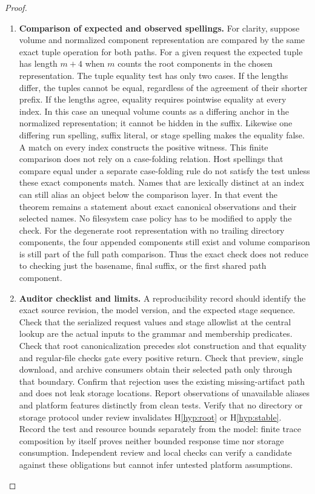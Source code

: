 \documentclass[12pt]{article}
\begin{document}
\begin{proof}
\begin{enumerate}
\item \textbf{Comparison of expected and observed spellings.}
For clarity, suppose volume and normalized component representation
are compared by the same exact tuple operation for both paths.
For a given request the expected tuple has length $m+4$ when
$m$ counts the root components in the chosen representation.
The tuple equality test has only two cases. If the lengths
differ, the tuples cannot be equal, regardless of the agreement
of their shorter prefix. If the lengths agree, equality requires
pointwise equality at every index. In this case an unequal
volume counts as a differing anchor in the normalized
representation; it cannot be hidden in the suffix.
Likewise one differing run spelling, suffix literal, or stage
spelling makes the equality false. A match on every index
constructs the positive witness. This finite comparison does not
rely on a case-folding relation. Host spellings that compare
equal under a separate case-folding rule do not satisfy the test
unless these exact components match. Names that are lexically
distinct at an index can still alias an object below the
comparison layer. In that event the theorem remains a statement
about exact canonical observations and their selected names.
No filesystem case policy has to be modified to apply the check.
For the degenerate root representation with no trailing directory
components, the four appended components still exist and volume
comparison is still part of the full path comparison.
Thus the exact check does not reduce to checking just the
basename, final suffix, or the first shared path component.

\item \textbf{Auditor checklist and limits.}
A reproducibility record should identify the exact source revision,
the model version, and the expected stage sequence. Check that the
serialized request values and stage allowlist at the central lookup
are the actual inputs to the grammar and membership predicates.
Check that root canonicalization precedes slot construction and
that equality and regular-file checks gate every positive return.
Check that preview, single download, and archive consumers obtain
their selected path only through that boundary. Confirm that
rejection uses the existing missing-artifact path and does not leak
storage locations. Report observations of unavailable aliases and
platform features distinctly from clean tests. Verify that no
directory or storage protocol under review invalidates
H\ref{hyp:root} or H\ref{hyp:stable}. Record the test and resource
bounds separately from the model: finite trace composition by itself
proves neither bounded response time nor storage consumption.
Independent review and local checks can verify a candidate against
these obligations but cannot infer untested platform assumptions.
\qedhere
\end{enumerate}
\end{proof}
\end{document}
